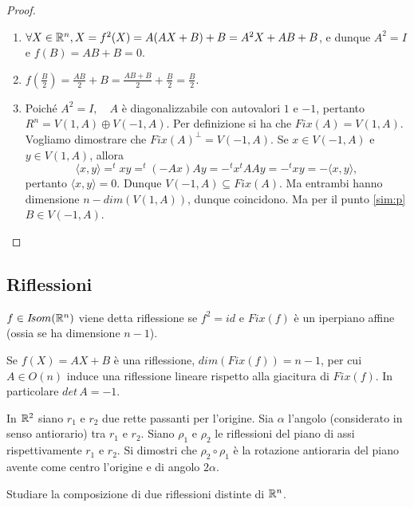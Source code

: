  \begin{proof}
 \begin{enumerate}[label=\bf\Roman*)]
 \item $\forall X\in \mathbb R^n,  X=f^2(X)=A(AX+B)+B=A^2X+AB+B$, e dunque
 $A^2=I$ e $f(B)=AB+B=0$.
 \item $f(\frac{B}{2})=\frac{AB}{2}+B=\frac{AB+B}{2}+\frac{B}{2}=\frac{B}{2}$.
 \item Poiché $A^2=I,\quad A$ è diagonalizzabile con autovalori $1$ e $-1$, pertanto
 $R^n=V(1,A)\oplus V(-1,A)$. Per definizione si ha che $Fix(A)=V(1,A)$.
 Vogliamo dimostrare che $Fix(A)^{\bot}=V(-1,A)$.  Se $x\in V(-1,A)$ e $y\in V(1,A)$, allora 
  \[
   \langle x,y\rangle=^txy=^t(-Ax)Ay=-^tx^tAAy=-^txy= -\langle x,y\rangle,
  \]
 pertanto $\langle x,y\rangle=0.$
 Dunque $V(-1,A)\subseteq Fix(A)$. Ma entrambi hanno dimensione
 $n-dim(V(1,A))$, dunque coincidono.
 Ma per il punto \ref{sim:p} $B\in V(-1,A)$.
 \end{enumerate}
 \end{proof}
 
	\subsection{Riflessioni}
 
 $f\in I\!som( \mathbb R^n )$ viene detta riflessione se $f^2=id$ e $Fix(f)$ 
 è un iperpiano affine (ossia se ha dimensione $n-1$).
 
 \begin{remark}
 Se $f(X)=AX+B$ è una riflessione, $dim(Fix(f))=n-1$, per cui
 $A\in O(n)$ induce una riflessione lineare rispetto alla giacitura di $Fix(f)$. In particolare $det\,A=-1$.
 \end{remark}
 
 \begin{exercise}
In $\mathbb R^2$ siano $r_1$ e $r_2$ due rette passanti per l'origine. Sia $\alpha$
 l'angolo (considerato in senso antiorario) tra $r_1$ e $r_2$. Siano $\rho_1$ e $\rho_2$
 le riflessioni del piano di assi rispettivamente $r_1$ e $r_2$.
 Si dimostri che $\rho_2\circ\rho_1$ è la rotazione antioraria del piano avente come centro l'origine e di angolo 
 $2\alpha$.
 \end{exercise}
 
 \begin{exercise}
 Studiare la composizione di due riflessioni distinte di $\mathbb R^n$.
 \end{exercise}
 

